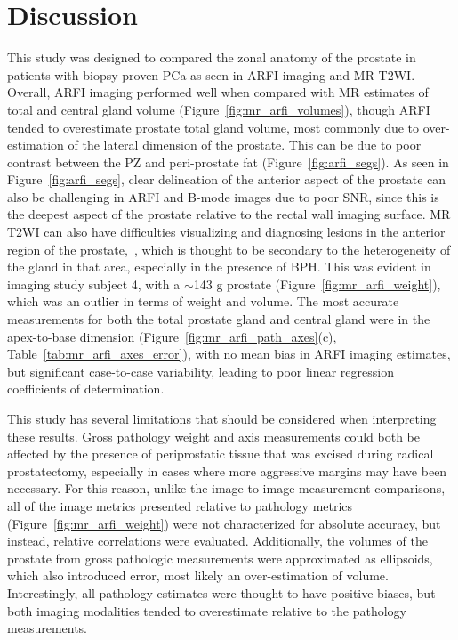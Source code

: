 \section{Discussion}\label{sect:discussion}
This study was designed to compared the zonal anatomy of the prostate in
patients with biopsy-proven PCa as seen in ARFI imaging and MR T2WI.  Overall,
ARFI imaging performed well when compared with MR estimates of total and
central gland volume (Figure~\ref{fig:mr_arfi_volumes}), though ARFI tended to
overestimate prostate total gland volume, most commonly due to over-estimation
of the lateral dimension of the prostate.  This can be due to poor contrast
between the PZ and peri-prostate fat (Figure~\ref{fig:arfi_segs}).  As seen in
Figure~\ref{fig:arfi_segs}, clear delineation of the anterior aspect of the
prostate can also be challenging in ARFI and B-mode images due to poor SNR,
since this is the deepest aspect of the prostate relative to the rectal wall
imaging surface. MR T2WI can also have difficulties visualizing and diagnosing
lesions in the anterior region of the prostate,~\cite{Gupta2013}, which is
thought to be secondary to the heterogeneity of the gland in that area,
especially in the presence of BPH.  This was evident in imaging study subject
4, with a $\sim$143 g prostate (Figure~\ref{fig:mr_arfi_weight}), which was an
outlier in terms of weight and volume.  The most accurate measurements for both
the total prostate gland and central gland were in the apex-to-base dimension
(Figure~\ref{fig:mr_arfi_path_axes}(c), Table~\ref{tab:mr_arfi_axes_error}),
with no mean bias in ARFI imaging estimates, but significant case-to-case
variability, leading to poor linear regression coefficients of determination.  

This study has several limitations that should be considered when interpreting
these results.  Gross pathology weight and axis measurements could both be
affected by the presence of periprostatic tissue that was excised during
radical prostatectomy, especially in cases where more aggressive margins may
have been necessary.  For this reason, unlike the image-to-image measurement
comparisons, all of the image metrics presented relative to pathology metrics
(Figure~\ref{fig:mr_arfi_weight}) were not characterized for absolute accuracy,
but instead, relative correlations were evaluated.  Additionally, the volumes
of the prostate from gross pathologic measurements were approximated as
ellipsoids, which also introduced error, most likely an over-estimation of
volume.  Interestingly, all pathology estimates were thought to have positive
biases, but both imaging modalities tended to overestimate relative to the
pathology measurements.

